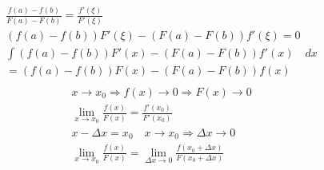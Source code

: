 \documentclass{article}
\begin{document}
  \begin{gather} %
    \begin{gathered}
      \frac{f\left( a \right) - f\left(b\right)}{F\left(a\right) - F\left(b\right)} = \frac{f'\left( \xi  \right)}{F'\left( \xi \right)} \\
      ( f(a) - f(b) ) F'(\xi) - ( F(a) - F(b) ) f'(\xi) = 0 \\
      \int ( f(a) - f(b) ) F'(x) - ( F(a) - F(b) ) f'(x) \quad dx \\
      = ( f(a) - f(b) ) F(x) - ( F(a) - F(b) ) f(x)
    \end{gathered}
  \end{gather}
  \begin{gather} %
    \begin{gathered}
      x \to x_{0} \Rightarrow  f(x) \to 0 \Rightarrow  F(x) \to 0 \\
      \lim_{x \to x_{0}}\frac{f(x)}{F(x)} = \frac{f'(x_{0})}{F'(x_{0})} \\
      x - \Delta{x} = x_{0} \quad x \to x_0 \Rightarrow \Delta{x} \to 0 \\
      \lim_{x \to x_{0}} \frac{f(x)}{F(x)}
      = \lim_{\Delta{x} \to 0} \frac{f(x_{0} + \Delta{x})}{F(x_{0} + \Delta{x})}
    \end{gathered}
  \end{gather}
\end{document}
